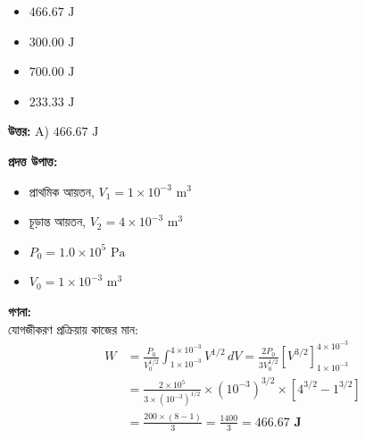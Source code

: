\documentclass[12pt, a4paper]{article}
\begin{document}
\begin{itemize}[label={}, leftmargin=1cm, itemsep=0.5em]
    \item[\textbf{A)}] $466.67\text{ J}$
    \item[\textbf{B)}] $300.00\text{ J}$
    \item[\textbf{C)}] $700.00\text{ J}$
    \item[\textbf{D)}] $233.33\text{ J}$
\end{itemize}

\vspace{0.5em}
\begin{tcolorbox}[answerbox]
    \textbf{\color{success} উত্তর:} A) $466.67\text{ J}$
\end{tcolorbox}
\vspace{1em}

\begin{tcolorbox}[solutionbox={সমাধান (Solution)}]
    \noindent
    \textbf{প্রদত্ত উপাত্ত:}
    \begin{itemize}[leftmargin=1.5em, itemsep=0.2em]
        \item প্রাথমিক আয়তন, $V_1 = 1 \times 10^{-3}\text{ m}^3$
        \item চূড়ান্ত আয়তন, $V_2 = 4 \times 10^{-3}\text{ m}^3$
        \item $P_0 = 1.0 \times 10^5\text{ Pa}$
        \item $V_0 = 1 \times 10^{-3}\text{ m}^3$
    \end{itemize}

    \vspace{0.6em}
    \noindent\textbf{গণনা:} \\
    যোগজীকরণ প্রক্রিয়ায় কাজের মান:
    \begin{align*}
        W &= \frac{P_0}{V_0^{1/2}} \int_{1 \times 10^{-3}}^{4 \times 10^{-3}} V^{1/2} \, dV = \frac{2 P_0}{3 V_0^{1/2}} \left[ V^{3/2} \right]_{1 \times 10^{-3}}^{4 \times 10^{-3}} \\
        &= \frac{2 \times 10^5}{3 \times (10^{-3})^{1/2}} \times (10^{-3})^{3/2} \times \left[ 4^{3/2} - 1^{3/2} \right] \\
        &= \frac{200 \times (8 - 1)}{3} = \frac{1400}{3} = \mathbf{466.67\text{ J}}
    \end{align*}
\end{tcolorbox}
\end{document}
